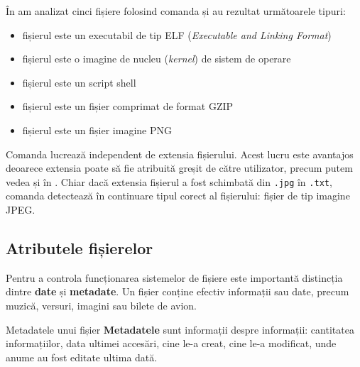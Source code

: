 În  am analizat cinci fișiere folosind comanda  și au rezultat următoarele tipuri:
\begin{itemize}
  \item fișierul  este un executabil de tip ELF (\textit{Executable and Linking Format}) 
  \item fișierul  este o imagine de nucleu (\textit{kernel}) de sistem de operare
  \item fișierul  este un script shell
  \item fișierul  este un fișier comprimat de format GZIP
  \item fișierul  este un fișier imagine PNG
\end{itemize}

Comanda  lucrează independent de extensia fișierului.
Acest lucru este avantajos deoarece extensia poate să fie atribuită greșit de către utilizator, precum putem vedea și în .
Chiar dacă extensia fișierul a fost schimbată din \texttt{.jpg} în \texttt{.txt}, comanda  detectează în continuare tipul corect al fișierului: fișier de tip imagine JPEG.


\subsection{Atributele fișierelor}
\label{sec:fs:file-attr}

Pentru a controla funcționarea sistemelor de fișiere este importantă distincția dintre \textbf{date} și \textbf{metadate}.
Un fișier conține efectiv informații sau date, precum muzică, versuri, imagini sau bilete de avion.

\begin{definition}{Metadatele unui fișier}
\textbf{Metadatele} sunt informații despre informații: cantitatea informațiilor, data ultimei accesări, cine le-a creat, cine le-a modificat, unde anume au fost editate ultima dată.
\end{definition}


